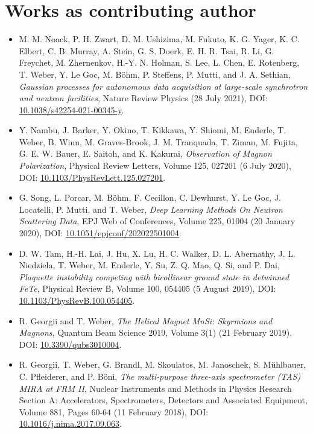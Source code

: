 \section{Works as contributing author}

\begin{itemize}
	\item M. M. Noack, P. H. Zwart, D. M. Ushizima, M. Fukuto, K. G. Yager, K. C. Elbert, 
		C. B. Murray, A. Stein, G. S. Doerk, E. H. R. Tsai, R. Li, G. Freychet, 
		M. Zhernenkov, H.-Y. N. Holman, S. Lee, L. Chen, E. Rotenberg, T. Weber, 
		Y. Le Goc, M. B\"ohm, P. Steffens, P. Mutti, and J. A. Sethian, 
	\textit{Gaussian processes for autonomous data acquisition at large-scale synchrotron and neutron facilities},
	Nature Review Physics (28 July 2021),
	DOI: \href{https://doi.org/10.1038/s42254-021-00345-y}{10.1038/s42254-021-00345-y}.

	\item Y. Nambu, J. Barker, Y. Okino, T. Kikkawa, Y. Shiomi, M. Enderle, T. Weber, B. Winn, M. Graves-Brook, J. M. Tranquada, T. Ziman, M. Fujita, G. E. W. Bauer, E. Saitoh, and K. Kakurai, 
	\textit{Observation of Magnon Polarization},
	Physical Review Letters, Volume 125, 027201 (6 July 2020),
	DOI: \href{https://doi.org/10.1103/PhysRevLett.125.027201}{10.1103/PhysRevLett.125.027201}.

	\item G. Song, L. Porcar, M. B\"ohm, F. Cecillon, C. Dewhurst, Y. Le Goc, J. Locatelli, P. Mutti, and T. Weber, 
	\textit{Deep Learning Methods On Neutron Scattering Data},
	EPJ Web of Conferences, Volume 225, 01004 (20 January 2020),
	DOI: \href{https://doi.org/10.1051/epjconf/202022501004}{10.1051/epjconf/202022501004}.

	\item D. W. Tam, H.-H. Lai, J. Hu, X. Lu, H. C. Walker, D. L. Abernathy, J. L. Niedziela, T. Weber, M. Enderle, Y. Su, Z. Q. Mao, Q. Si, and P. Dai,
	\textit{Plaquette instability competing with bicollinear ground state in detwinned FeTe},
	Physical Review B, Volume 100, 054405 (5 August 2019),
	DOI: \href{https://doi.org/10.1103/PhysRevB.100.054405}{10.1103/PhysRevB.100.054405}.
	
	\item R. Georgii and T. Weber,
	\textit{The Helical Magnet MnSi: Skyrmions and Magnons},
	Quantum Beam Science 2019, Volume 3(1) (21 February 2019),
	DOI: \href{https://doi.org/10.3390/qubs3010004}{10.3390/qubs3010004}.
	
	\item R. Georgii, T. Weber, G. Brandl, M. Skoulatos, M. Janoschek, S. Mühlbauer, C. Pfleiderer, and P. B\"oni,
	\textit{The multi-purpose three-axis spectrometer (TAS) MIRA at FRM II},
	Nuclear Instruments and Methods in Physics Research Section A: Accelerators, Spectrometers, Detectors and Associated Equipment, Volume 881, Pages 60-64 (11 February 2018),
	DOI: \href{https://doi.org/10.1016/j.nima.2017.09.063}{10.1016/j.nima.2017.09.063}.
\end{itemize}
